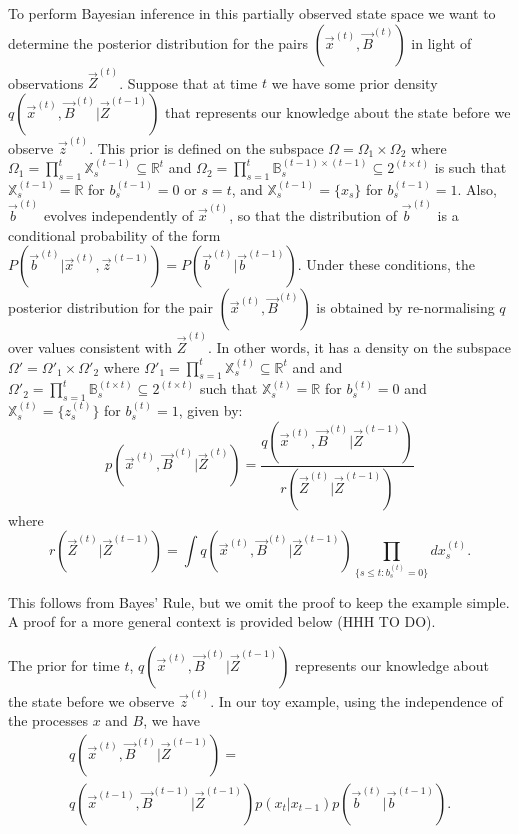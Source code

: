 To perform Bayesian inference in this partially observed state space we want to determine the posterior distribution for the pairs $(\vec{x}^{(t)}, \vec{B}^{(t)})$ in light of observations $\vec{Z}^{(t)}$. Suppose that at time $t$ we have some prior density $q(\vec{x}^{(t)},\vec{B}^{(t)} | \vec{Z}^{(t-1)})$ that represents our knowledge about the state before we observe $\vec{z}^{(t)}$. This prior is defined on the subspace $\Omega = \Omega_1 \times \Omega_2$ where $\Omega_1 = \prod_{s=1}^t \mathbb{X}_s^{(t-1)} \subseteq \mathbb{R}^t$ and $\Omega_2 = \prod_{s=1}^t \mathbb{B}_s^{(t-1) \times (t-1)} \subseteq 2^{(t \times t)}$ is such that $\mathbb{X}_s^{(t-1)} = \mathbb{R}$ for $b_s^{(t-1)} = 0$ or $s=t$, and $\mathbb{X}_s^{(t-1)} = \{ x_s \}$ for $b_s^{(t-1)} = 1$. Also, $\vec{b}^{(t)}$ evolves independently of $\vec{x}^{(t)}$, so that the distribution of $\vec{b}^{(t)}$ is a conditional probability of the form $P(\vec{b}^{(t)} | \vec{x}^{(t)}, \vec{z}^{(t-1)} ) = P( \vec{b}^{(t)} | \vec{b}^{(t-1)} )$. Under these conditions, the posterior distribution for the pair $(\vec{x}^{(t)}, \vec{B}^{(t)})$ is obtained by re-normalising $q$ over values consistent with $\vec{Z}^{(t)}$. In other words, it has a density on the subspace $\Omega' = \Omega'_1 \times \Omega'_2$ where $\Omega'_1 = \prod_{s=1}^t \mathbb{X}_s^{(t)} \subseteq \mathbb{R}^t$ and and $\Omega'_2 = \prod_{s=1}^t \mathbb{B}_s^{(t \times t)} \subseteq 2^{(t \times t)}$ such that $\mathbb{X}_s^{(t)} = \mathbb{R}$ for $b_s^{(t)} = 0$ and $\mathbb{X}_s^{(t)} = \{ z_s^{(t)}\}$ for $b_s^{(t)} = 1$, given by:
\[
p(\vec{x}^{(t)}, \vec{B}^{(t)} | \vec{Z}^{(t)})  =   
\frac{ q(\vec{x}^{(t)}, \vec{B}^{(t)}|\vec{Z}^{(t-1)})} {r(\vec{Z}^{(t)} | \vec{Z}^{(t-1)})}
\]
where 
\[
r(\vec{Z}^{(t)} | \vec{Z}^{(t-1)}) = \int q(\vec{x}^{(t)}, \vec{B}^{(t)}|\vec{Z}^{(t-1)}) \prod_{\{s \leq t: b_s^{(t)} = 0\}} dx_s^{(t)}.
\]

This follows from Bayes' Rule, but we omit the proof to keep the example simple. A proof for a more general context is provided below (HHH TO DO).

The prior for time $t$, $q(\vec{x}^{(t)},\vec{B}^{(t)} | \vec{Z}^{(t-1)})$ represents our knowledge about the state before we observe $\vec{z}^{(t)}$. In our toy example, using the independence of the processes $x$ and $B$, we have
\begin{multline}
    q(\vec{x}^{(t)},\vec{B}^{(t)} | \vec{Z}^{(t-1)}) = \\ q(\vec{x}^{(t-1)},\vec{B}^{(t-1)} | \vec{Z}^{(t-1)}) p(x_t | x_{t-1}) p(\vec{b}^{(t)} | \vec{b}^{(t-1)}).
\end{multline}


